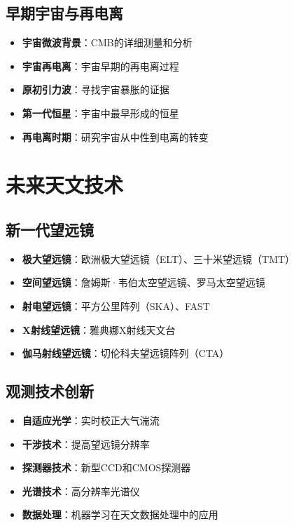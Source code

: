 \documentclass[12pt,UTF8]{ctexbook}
\begin{document}
\section{早期宇宙与再电离}

\begin{itemize}
  \item \textbf{宇宙微波背景}：CMB的详细测量和分析
  \item \textbf{宇宙再电离}：宇宙早期的再电离过程
  \item \textbf{原初引力波}：寻找宇宙暴胀的证据
  \item \textbf{第一代恒星}：宇宙中最早形成的恒星
  \item \textbf{再电离时期}：研究宇宙从中性到电离的转变
\end{itemize}

\chapter{未来天文技术}
\section{新一代望远镜}

\begin{itemize}
  \item \textbf{极大望远镜}：欧洲极大望远镜（ELT）、三十米望远镜（TMT）
  \item \textbf{空间望远镜}：詹姆斯·韦伯太空望远镜、罗马太空望远镜
  \item \textbf{射电望远镜}：平方公里阵列（SKA）、FAST
  \item \textbf{X射线望远镜}：雅典娜X射线天文台
  \item \textbf{伽马射线望远镜}：切伦科夫望远镜阵列（CTA）
\end{itemize}

\section{观测技术创新}

\begin{itemize}
  \item \textbf{自适应光学}：实时校正大气湍流
  \item \textbf{干涉技术}：提高望远镜分辨率
  \item \textbf{探测器技术}：新型CCD和CMOS探测器
  \item \textbf{光谱技术}：高分辨率光谱仪
  \item \textbf{数据处理}：机器学习在天文数据处理中的应用
\end{itemize}
\end{document}
